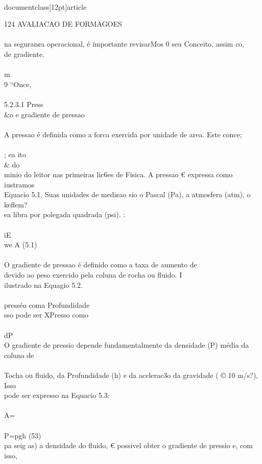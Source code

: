 \\documentclass[12pt]{article}
\begin{document}
{124 AVALIACAO DE FORMAGOES\\
\\
na seguran¢a operacional, é importante revisarMos 0 seu Conceito, assim co,\\
de gradiente.\\
\\
m\\
9 “Once,\\
\\
5.2.3.1 Press\\&o e gradiente de pressao\\
\\
A pressao é definida como a forca exercida por unidade de area. Este conce;\\
\\
; ea ito \\& do\\
minio do leitor nas primeiras lic6es de Fisica. A pressao € expressa como iustramos\\
Equacio 5.1. Suas unidades de medi¢ao sio o Pascal (Pa), a atmosfera (atm), o keflem?\\
ea libra por polegada quadrada (psi). :\\
\\
iE\\
we A (5.1)\\
\\
O gradiente de pressao é definido como a taxa de aumento de\\
devido ao peso exercido pela coluna de rocha ou fluido. I\\
ilustrado na Equagio 5.2.\\
\\
presséo coma Profundidade\\
sso pode ser XPresso como\\
\\
dP\\
O gradiente de pressio depende fundamentalmente da densidade (P) média da coluna de\\
\\
Tocha ou fluido, da Profundidade (h) e da acelerac3o da gravidade ( © 10 m/s?), Isso\\
pode ser expresso na Equacio 5.3:\\
\\
A=\\
\\
P=pgh (53)\\
pa seig as) a densidade do fluido, € possivel obter o gradiente de pressio e, com isso,\\
}
\end{document}

